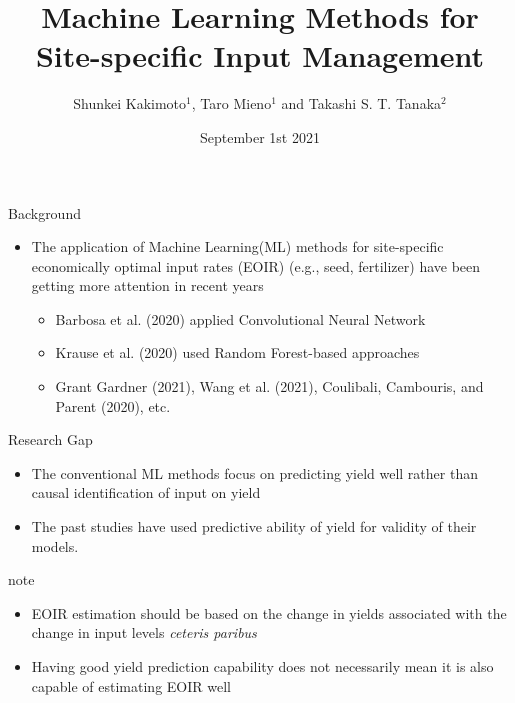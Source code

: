 \documentclass[
  12pt,
  ignorenonframetext,
  aspectratio=169,
]{beamer}
\title{Machine Learning Methods for Site-specific Input Management}
\author{Shunkei Kakimoto\(^1\), Taro Mieno\(^1\) and Takashi S. T.
Tanaka\(^2\)}
\date{September 1st 2021}
\institute{\(^1\)Agricultural Economics, University of Nebraska Lincoln
\(^2\)Applied Biological Sciences, Gifu University}
\providecommand{\tightlist}{%
  \setlength{\itemsep}{0pt}\setlength{\parskip}{0pt}}
\begin{document}
\frame{\titlepage}

\begin{frame}{Background}
\protect\hypertarget{background}{}
\begin{itemize}
\tightlist
\item
  The application of Machine Learning(ML) methods for site-specific
  economically optimal input rates (EOIR) (e.g., seed, fertilizer) have
  been getting more attention in recent years \newline

  \begin{itemize}
  \tightlist
  \item
    Barbosa et al. (2020) applied Convolutional Neural Network
  \item
    Krause et al. (2020) used Random Forest-based approaches
  \item
    Grant Gardner (2021), Wang et al. (2021), Coulibali, Cambouris, and
    Parent (2020), etc.
  \end{itemize}
\end{itemize}
\end{frame}

\begin{frame}{Research Gap}
\protect\hypertarget{research-gap}{}
\begin{itemize}
\tightlist
\item
  The conventional ML methods focus on predicting yield well rather than
  causal identification of input on yield
\item
  The past studies have used predictive ability of yield for validity of
  their models. \newline
\end{itemize}

\begin{block}{note}
\protect\hypertarget{note}{}
\begin{itemize}
\tightlist
\item
  EOIR estimation should be based on the change in yields associated
  with the change in input levels \emph{ceteris paribus}
\item
  Having good yield prediction capability does not necessarily mean it
  is also capable of estimating EOIR well
\end{itemize}
\end{block}
\end{frame}
\end{document}
